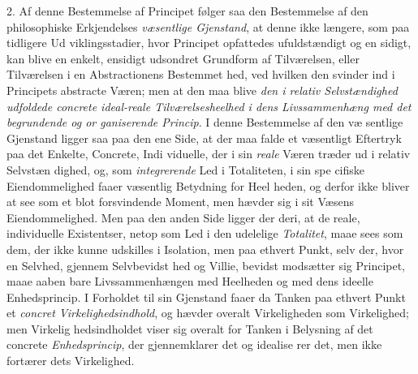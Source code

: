 2. Af denne Bestemmelse af Principet følger saa den
Bestemmelse af den philosophiske Erkjendelses \emph{væsentlige
Gjenstand}, at denne ikke længere, som paa tidligere Ud\-%
viklingsstadier, hvor Principet opfattedes ufuldstændigt og en\-%
sidigt, kan blive en enkelt, ensidigt udsondret Grundform af
Tilværelsen, eller Tilværelsen i en Abstractionens Bestemmet\-%
hed, ved hvilken den svinder ind i Principets abstracte Væren;
men at den maa blive \emph{den i relativ Selvstændighed
udfoldede concrete ideal-reale Tilværelsesheelhed i
dens Livssammenhæng med det begrundende og or\-%
ganiserende Princip}. I denne Bestemmelse af den væ\-%
sentlige Gjenstand ligger saa paa den ene Side, at der maa
falde et væsentligt Eftertryk paa det Enkelte, Concrete, Indi\-%
viduelle, der i sin \emph{reale} Væren træder ud i relativ Selvstæn\-%
dighed, og, som \emph{integrerende} Led i Totaliteten, i sin spe\-%
cifiske Eiendommelighed faaer væsentlig Betydning for Heel\-%
heden, og derfor ikke bliver at see som et blot forsvindende
Moment, men hævder sig i sit Væsens Eiendommelighed. Men
paa den anden Side ligger der deri, at de reale, individuelle
Existentser, netop som Led i den udelelige \emph{Totalitet}, maae
sees som dem, der ikke kunne udskilles i Isolation, men paa
ethvert Punkt, selv der, hvor en Selvhed, gjennem Selvbevidst\-%
hed og Villie, bevidst modsætter sig Principet, maae aaben\-%
bare Livssammenhængen med Heelheden og med dens ideelle
Enhedsprincip. I Forholdet til sin Gjenstand faaer da Tanken
paa ethvert Punkt et \emph{concret Virkelighedsindhold}, og
hævder overalt Virkeligheden som Virkelighed; men Virkelig\-%
hedsindholdet viser sig overalt for Tanken i Belysning af det
concrete \emph{Enhedsprincip}, der gjennemklarer det og idealise\-%
rer det, men ikke fortærer dets Virkelighed.


